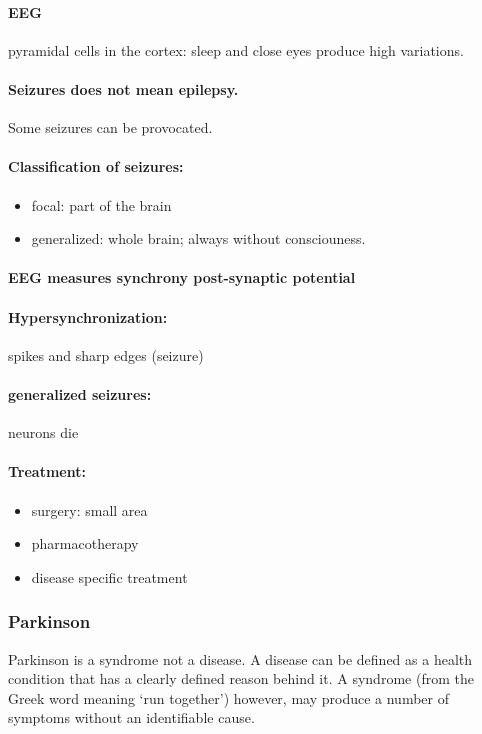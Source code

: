 \documentclass[12pt,article,oneside,a4paper]{memoir}
\begin{document}
\paragraph{EEG} pyramidal cells in the cortex: sleep and close eyes produce high variations.
\paragraph{Seizures does not mean epilepsy.} Some seizures can be provocated.

\paragraph{Classification of seizures:}
\begin{itemize}
\item focal: part of the brain
\item generalized: whole brain; always without consciouness.
\end{itemize}

\paragraph{EEG measures synchrony post-synaptic potential}

\paragraph{Hypersynchronization:} spikes and sharp edges (seizure)
\paragraph{generalized seizures:} neurons die

\paragraph{Treatment:}
\begin{itemize}
\item surgery: small area
\item pharmacotherapy
\item disease specific treatment
\end{itemize}

\subsubsection{Parkinson}
Parkinson is a syndrome not a disease. A disease can be defined as a health condition that has a clearly defined reason behind it. A syndrome (from the Greek word meaning ‘run together’) however, may produce a number of symptoms without an identifiable cause.
\end{document}
